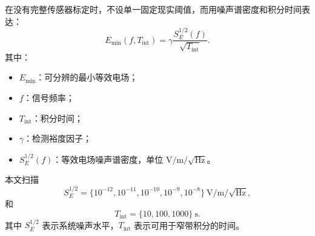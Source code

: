 在没有完整传感器标定时，不设单一固定现实阈值，而用噪声谱密度和积分时间表达：
\begin{equation}
    E_{\min}(f,T_{\mathrm{int}})
    =\gamma\frac{S_E^{1/2}(f)}{\sqrt{T_{\mathrm{int}}}}.
    \label{eq:emin_spectral}
\end{equation}
其中：
\begin{itemize}
    \item $E_{\min}$：可分辨的最小等效电场；
    \item $f$：信号频率；
    \item $T_{\mathrm{int}}$：积分时间；
    \item $\gamma$：检测裕度因子；
    \item $S_E^{1/2}(f)$：等效电场噪声谱密度，单位 $\mathrm{V/m/\sqrt{Hz}}$。
\end{itemize}

本文扫描
\begin{equation}
    S_E^{1/2}=\{10^{-12},10^{-11},10^{-10},10^{-9},10^{-8}\}\ \mathrm{V/m/\sqrt{Hz}},
\end{equation}
和
\begin{equation}
    T_{\mathrm{int}}=\{10,100,1000\}\ \mathrm{s}.
\end{equation}
其中 $S_E^{1/2}$ 表示系统噪声水平，$T_{\mathrm{int}}$ 表示可用于窄带积分的时间。

